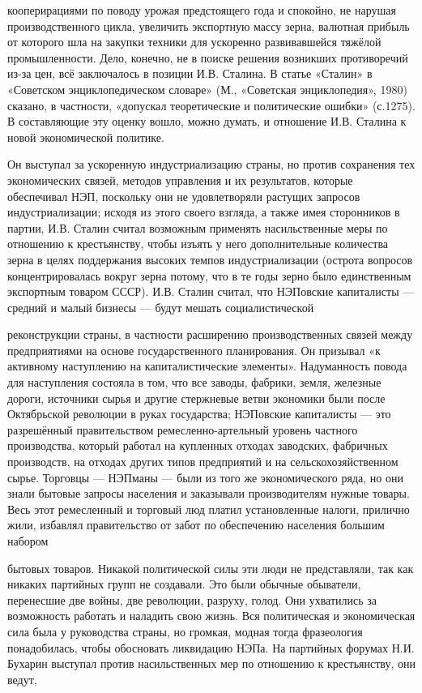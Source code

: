 \label{108-1}
кооперирациями по поводу урожая предстоящего года и спокойно, не нарушая производственного цикла, увеличить экспортную массу зерна, валютная прибыль от которого шла на закупки техники для ускоренно развивавшейся тяжёлой промышленности. Дело, конечно, не в поиске решения возникших противоречий из-за цен, всё заключалось в позиции И.В. Сталина. В статье «Сталин» в «Советском энциклопедическом словаре» (М., «Советская энциклопедия», 1980) сказано, в частности, «допускал теоретические и политические ошибки» (с.1275). В составляющие эту оценку вошло, можно думать, и отношение И.В. Сталина к новой экономической политике.

\label{109-1}
Он выступал за ускоренную индустриализацию страны, но против сохранения тех экономических связей, методов управления и их результатов, которые обеспечивал НЭП, поскольку они не удовлетворяли растущих запросов индустриализации; исходя из этого своего взгляда, а также имея сторонников в партии, И.В. Сталин считал возможным применять насильственные меры по отношению к крестьянству, чтобы изъять у него дополнительные количества зерна в целях поддержания высоких темпов индустриализации (острота вопросов концентрировалась вокруг зерна потому, что в те годы зерно было единственным экспортным товаром СССР). И.В. Сталин считал, что НЭПовские капиталисты — средний и малый бизнесы — будут мешать социалистической 

\label{110-1}
реконструкции страны, в частности расширению производственных связей между предприятиями на основе государственного планирования. Он призывал «к активному наступлению на капиталистические элементы». Надуманность повода для наступления состояла в том, что все заводы, фабрики, земля, железные дороги, источники сырья и другие стержневые ветви экономики были после Октябрьской революции в руках государства; НЭПовские капиталисты — это разрешённый правительством ремесленно-артельный уровень частного производства, который работал на купленных отходах заводских, фабричных производств, на отходах других типов предприятий и на сельскохозяйственном сырье. Торговцы — НЭПманы — были из того же экономического ряда, но они знали бытовые запросы населения и заказывали производителям нужные товары. Весь этот ремесленный и торговый люд платил установленные налоги, прилично жили, избавлял правительство от забот по обеспечению населения большим набором

\label{111-1}
 бытовых товаров. Никакой политической силы эти люди не представляли, так как никаких партийных групп не создавали. Это были обычные обыватели, перенесшие две войны, две революции, разруху, голод. Они ухватились за возможность работать и наладить свою жизнь. Вся политическая и экономическая сила была у руководства страны, но громкая, модная тогда фразеология понадобилась, чтобы обосновать ликвидацию НЭПа. На партийных форумах Н.И. Бухарин выступал против насильственных мер по отношению к крестьянству, они ведут,

